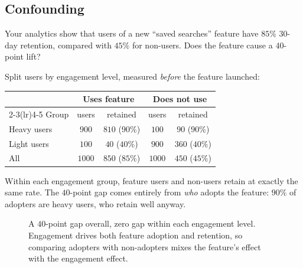 \subsection{Confounding}

Your analytics show that users of a new ``saved searches'' feature have $85\%$ 30-day
retention, compared with $45\%$ for non-users. Does the feature cause a $40$-point lift?

Split users by engagement level, measured \emph{before} the feature launched:

\begin{center}
\renewcommand{\arraystretch}{1.2}
\begin{tabular}{@{}lcccc@{}}
\toprule
 & \multicolumn{2}{c}{Uses feature} & \multicolumn{2}{c}{Does not use} \\
\cmidrule(lr){2-3}\cmidrule(lr){4-5}
Group & users & retained & users & retained \\
\midrule
Heavy users & $900$ & $810$ ($90\%$) & $100$ & $90$ ($90\%$) \\
Light users & $100$ & $40$ ($40\%$) & $900$ & $360$ ($40\%$) \\
\midrule
All & $1000$ & $850$ ($85\%$) & $1000$ & $450$ ($45\%$) \\
\bottomrule
\end{tabular}
\end{center}

Within each engagement group, feature users and non-users retain at exactly the same
rate. The $40$-point gap comes entirely from \emph{who} adopts the feature: $90\%$ of
adopters are heavy users, who retain well anyway.

\begin{figure}[H]
\centering
{}
\caption{A $40$-point gap overall, zero gap within each engagement level. Engagement
drives both feature adoption and retention, so comparing adopters with non-adopters
mixes the feature's effect with the engagement effect.}
\label{fig:sampling-confound-bars}
\end{figure}

